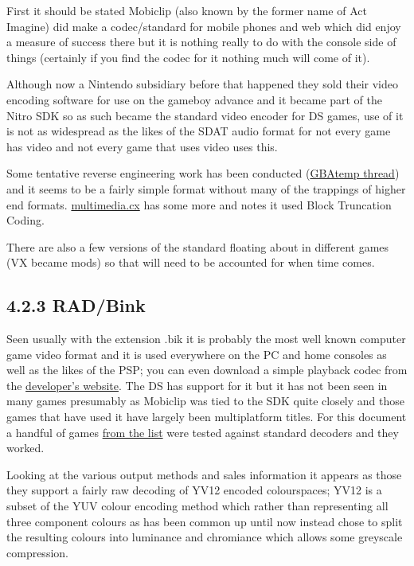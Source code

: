 \documentclass[
]{book}
\begin{document}
First it should be stated Mobiclip (also known by the former name of Act Imagine) did make a codec/standard for mobile phones and web which did enjoy a measure of success there but it is nothing really to do with the console side of things (certainly if you find the codec for it nothing much will come of it).

Although now a Nintendo subsidiary before that happened they sold their video encoding software for use on the gameboy advance and it became part of the Nitro SDK so as such became the standard video encoder for DS games, use of it is not as widespread as the likes of the SDAT audio format for not every game has video and not every game that uses video uses this.

Some tentative reverse engineering work has been conducted (\href{http://gbatemp.net/topic/125374-player-of-vx-file/page__view__findpost__p__3830983}{GBAtemp thread}) and it seems to be a fairly simple format without many of the trappings of higher end formats. \href{http://wiki.multimedia.cx/index.php?title=Mobiclip_Video_Codec}{multimedia.cx} has some more and notes it used Block Truncation Coding.

There are also a few versions of the standard floating about in different games (VX became mods) so that will need to be accounted for when time comes.

\hypertarget{radbink}{%
\subsection{4.2.3 RAD/Bink}\label{radbink}}

Seen usually with the extension .bik it is probably the most well known computer game video format and it is used everywhere on the PC and home consoles as well as the likes of the PSP; you can even download a simple playback codec from the \href{http://www.radgametools.com/bnkdown.htm}{developer's website}. The DS has support for it but it has not been seen in many games presumably as Mobiclip was tied to the SDK quite closely and those games that have used it have largely been multiplatform titles. For this document a handful of games \href{http://www.radgametools.com/binkgames.htm\#games}{from the list} were tested against standard decoders and they worked.

Looking at the various output methods and sales information it appears as those they support a fairly raw decoding of YV12 encoded colourspaces; YV12 is a subset of the YUV colour encoding method which rather than representing all three component colours as has been common up until now instead chose to split the resulting colours into luminance and chromiance which allows some greyscale compression.
\end{document}
